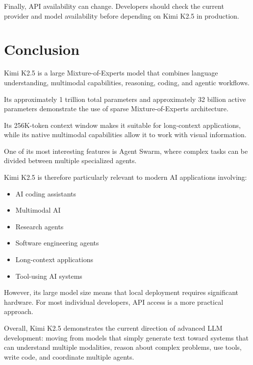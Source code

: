 \documentclass{article}
\begin{document}
Finally, API availability can change. Developers should check the current provider and model availability before depending on Kimi K2.5 in production.

\section{Conclusion}

Kimi K2.5 is a large Mixture-of-Experts model that combines language understanding, multimodal capabilities, reasoning, coding, and agentic workflows.

Its approximately 1 trillion total parameters and approximately 32 billion active parameters demonstrate the use of sparse Mixture-of-Experts architecture.

Its 256K-token context window makes it suitable for long-context applications, while its native multimodal capabilities allow it to work with visual information.

One of its most interesting features is Agent Swarm, where complex tasks can be divided between multiple specialized agents.

Kimi K2.5 is therefore particularly relevant to modern AI applications involving:

\begin{itemize}
\item AI coding assistants
\item Multimodal AI
\item Research agents
\item Software engineering agents
\item Long-context applications
\item Tool-using AI systems
\end{itemize}

However, its large model size means that local deployment requires significant hardware. For most individual developers, API access is a more practical approach.

Overall, Kimi K2.5 demonstrates the current direction of advanced LLM development: moving from models that simply generate text toward systems that can understand multiple modalities, reason about complex problems, use tools, write code, and coordinate multiple agents.
\end{document}
